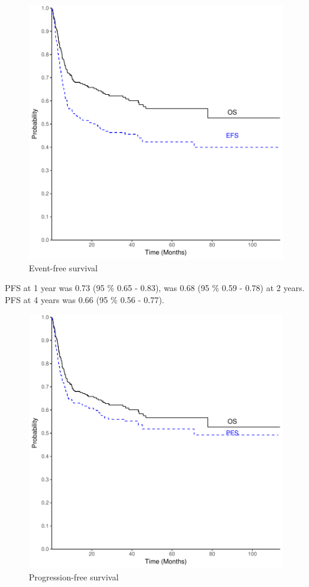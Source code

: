 \documentclass[a4paper,11pt] {article}
\begin{document}
\begin{figure}[h]
\begin{center}
\includegraphics{Rapport-fig2}
\end{center}
\caption{Event-free survival}
\label{fig2}
\end{figure}

\pagebreak
PFS at 1 year was 0.73 (95 \% 0.65 - 0.83), was 0.68 (95 \% 0.59 - 0.78) at 2 years. PFS at 4 years was 0.66 (95 \% 0.56 - 0.77).

\begin{figure}[h]
\begin{center}
\includegraphics{Rapport-fig3}
\end{center}
\caption{Progression-free survival}
\label{fig3}
\end{figure}
\end{document}
